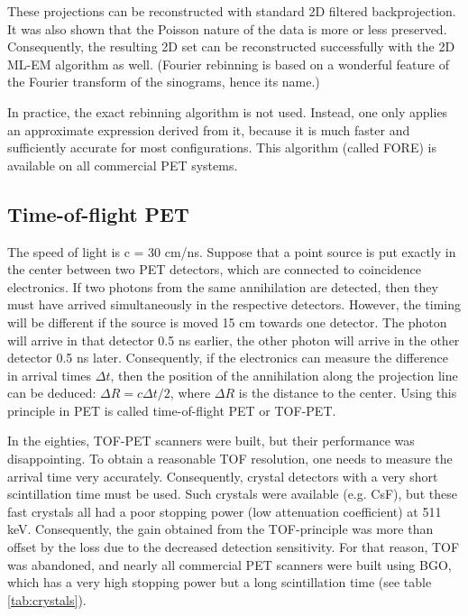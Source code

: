 \documentclass[11pt,oneside]{article}
\begin{document}
These projections can be reconstructed with standard 2D filtered
backprojection.  It was also shown that the Poisson nature of the data
is more or less preserved.  Consequently, the resulting 2D set can be
reconstructed successfully with the 2D ML-EM algorithm as
well. (Fourier rebinning is based on a wonderful feature of the
Fourier transform of the sinograms, hence its name.)

In practice, the exact rebinning algorithm is not used. Instead, one
only applies an approximate expression derived from it, because it is
much faster and sufficiently accurate for most configurations. This
algorithm (called FORE) is available on all commercial PET systems.

\subsection{Time-of-flight PET} \label{sec:TOF}
The speed of light is c = 30 cm/ns. Suppose that a point source is put
exactly in the center between two PET detectors, which are connected
to coincidence electronics. If two photons from the same annihilation
are detected, then they must have arrived simultaneously in the
respective detectors. However, the timing will be different if the
source is moved 15 cm towards one detector. The photon will arrive in
that detector 0.5 ns earlier, the other photon will arrive in the
other detector 0.5 ns later. Consequently, if the electronics can
measure the difference in arrival times $\Delta t$, then the position
of the annihilation along the projection line can be deduced: $\Delta
R = c \Delta t / 2$, where $\Delta R$ is the distance to the
center. Using this principle in PET is called time-of-flight PET or
TOF-PET.

In the eighties, TOF-PET scanners were built, but their performance
was disappointing. To obtain a reasonable TOF resolution, one needs to
measure the arrival time very accurately. Consequently, crystal
detectors with a very short scintillation time must be used. Such
crystals were available (e.g. CsF), but these fast crystals all had a
poor stopping power (low attenuation coefficient) at 511
keV. Consequently, the gain obtained from the TOF-principle was more
than offset by the loss due to the decreased detection
sensitivity. For that reason, TOF was abandoned, and nearly all
commercial PET scanners were built using BGO, which has a very high
stopping power but a long scintillation time (see table
\ref{tab:crystals}).
\end{document}

